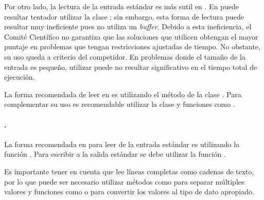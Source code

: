   Por otro lado, la lectura de la entrada estándar es más sutil en \java.
  En \java puede resultar tentador utilizar la clase ; sin embargo, esta forma de lectura puede resultar muy ineficiente pues no
  utiliza un \textit{buffer}.
  Debido a esta ineficiencia, el Comité Científico no garantiza que las
  soluciones que utilicen  obtengan el mayor puntaje en problemas
  que tengan restricciones ajustadas de tiempo.
  No obstante, su uso queda a criterio del competidor.
  En problemas donde el tamaño de la entrada es pequeño, utilizar 
  puede no resultar significativo en el tiempo total de ejecución.

  La forma recomendada de leer en \java es utilizando el método 
  de la clase .
  Para complementar su uso es recomendable utilizar la clase
   y funciones como .

\paragraph{\python.} {\new
  La forma recomendada en \python para leer de la entrada estándar es
  utilizando la función .
  Para escribir a la salida estándar se debe utilizar la función .
  
  Es importante tener en cuenta que  lee líneas completas como
  cadenas de texto, por lo que puede ser necesario utilizar métodos como
   para separar múltiples valores y funciones como 
  o  para convertir los valores al tipo de dato apropiado.
}

